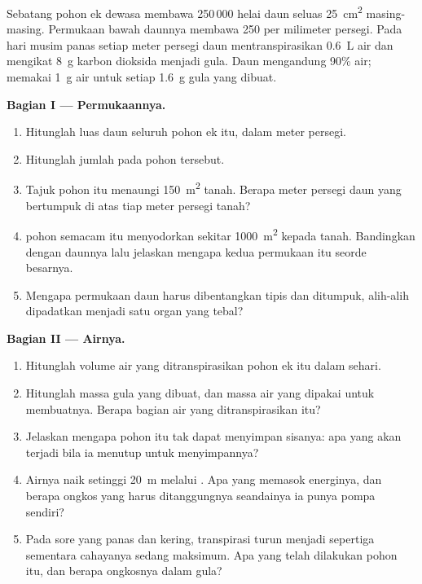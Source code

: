 \begin{problem}
\label{pb:g12:plant-rooted-life:1}
Sebatang pohon ek dewasa membawa 250\,000 helai daun seluas
\qty{25}{cm^2} masing-masing. Permukaan bawah daunnya membawa 250 
per milimeter persegi. Pada hari musim panas setiap meter persegi daun
mentranspirasikan \qty{0.6}{L} air dan mengikat \qty{8}{g} karbon
dioksida menjadi gula. Daun mengandung 90\% air;  memakai
\qty{1}{g} air untuk setiap \qty{1.6}{g} gula yang dibuat.

\medskip
\noindent\textbf{Bagian I --- Permukaannya.}
\begin{enumerate}
  \item Hitunglah luas daun seluruh pohon ek itu, dalam meter persegi.
  \item Hitunglah jumlah  pada pohon tersebut.
  \item Tajuk pohon itu menaungi \qty{150}{m^2} tanah. Berapa meter
        persegi daun yang bertumpuk di atas tiap meter persegi tanah?
  \item {} pohon semacam itu menyodorkan sekitar
        \qty{1000}{m^2} kepada tanah. Bandingkan dengan daunnya lalu
        jelaskan mengapa kedua permukaan itu seorde besarnya.
  \item Mengapa permukaan daun harus dibentangkan tipis dan
        ditumpuk, alih-alih dipadatkan menjadi satu organ yang tebal?
\end{enumerate}

\medskip
\noindent\textbf{Bagian II --- Airnya.}
\begin{enumerate}[resume]
  \item Hitunglah volume air yang ditranspirasikan pohon ek itu dalam
        sehari.
  \item Hitunglah massa gula yang dibuat, dan massa air yang dipakai
        untuk membuatnya. Berapa bagian air yang ditranspirasikan itu?
  \item Jelaskan mengapa pohon itu tak dapat menyimpan sisanya: apa
        yang akan terjadi bila ia menutup  untuk menyimpannya?
  \item Airnya naik setinggi \qty{20}{m} melalui . Apa yang
        memasok energinya, dan berapa ongkos yang harus ditanggungnya
        seandainya ia punya pompa sendiri?
  \item Pada sore yang panas dan kering, transpirasi turun menjadi
        sepertiga sementara cahayanya sedang maksimum. Apa yang telah
        dilakukan pohon itu, dan berapa ongkosnya dalam gula?
\end{enumerate}


\end{problem}
